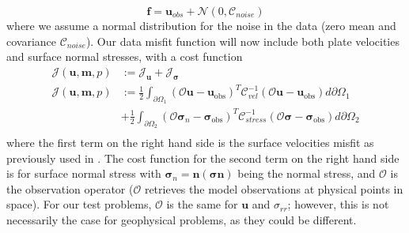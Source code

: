 \documentclass[12pt]{article}
\newcommand{\mm}{{\ensuremath{\boldsymbol{m}}}}
\newcommand{\uu}{{\ensuremath{\boldsymbol{u}}}}
\newcommand{\ff}{{\ensuremath{\boldsymbol{f}}}}
\newcommand{\ssigma}{{\ensuremath{\boldsymbol{\sigma}}}}
\begin{document}
\begin{equation}
\ff = \uu_{obs} + \mathcal{N}(0,\mathcal{C}_{noise})
\end{equation}
where we assume a normal distribution for the noise in the data (zero mean and covariance $\mathcal{C}_{noise}$).
Our data misfit function will now include both plate velocities and surface normal stresses, with a cost function
\begin{equation}
\begin{split}
  \mathcal{J}(\uu,\mm,p)&:= \mathcal{J}_{\uu} + \mathcal{J}_{\ssigma} \\
  \mathcal{J}(\uu,\mm,p)&:= \frac{1}{2}\int_{\partial \Omega_1} (\mathcal{O}\uu-\uu_{\text{obs}})^T\mathcal{C}^{-1}_{vel}(\mathcal{O}\uu-\uu_{\text{obs}})d\partial\Omega_1 \\ 
   &+ \frac{1}{2}\int_{\partial\Omega_2} (\mathcal{O}\ssigma_n-\ssigma_{\text{obs}})^T\mathcal{C}^{-1}_{stress}(\mathcal{O}\ssigma -\ssigma_{\text{obs}})d\partial\Omega_2 \\ 
\end{split}
\end{equation}
where the first term on the right hand side is the surface velocities misfit as previously used in \citep{ratnaswamy2015adjoint}. 
The cost function for the second term on the right hand side is for surface normal stress with $\ssigma_n = \textbf{n}(\ssigma \textbf{n})$ being the normal stress, and $\mathcal{O}$ is the observation operator ($\mathcal{O}$ retrieves the model observations at physical points in space). For our test problems, $\mathcal{O}$ is the same for $\uu$ and $\sigma_{rr}$; however, this is not necessarily the case for geophysical problems, as they could be different.
 
\end{document}
